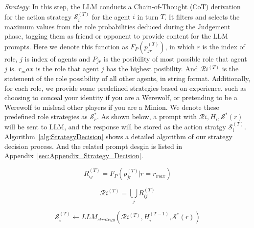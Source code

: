 \documentclass[11pt]{article}
\begin{document}
\textit{Strategy}: In this step, the LLM conducts a Chain-of-Thought (CoT) derivation for the action strategy $ \mathcal{S} _{i}^{(T)} $ for the agent $ i $ in turn $ T $. It filters and selects the maximum values from the role probabilities deduced during the Judgement phase, tagging them as friend or opponent to provide content for the LLM prompts. Here we denote this function as $ F_P( p_{jr}^{(T)} ) $, in which $ r $ is the index of role, $ j $ is index of agents and $ P_{jr} $ is the posibility of most possible role that agent $ j $ is. $ r_max $ is the role that agent $ j $ has the highest posibility. And $ \mathcal{R} {i}^{(T)} $ is the statement of the role possibility of all other agents, in string format. Additionally, for each role, we provide some predefined strategies based on experience, such as choosing to conceal your identity if you are a Werewolf, or pretending to be a Werewolf to mislead other players if you are a Minion. We denote these predefined role strategies as $ \mathcal{S} ^*_r $. As shown below, a prompt with $ \mathcal{R} i,H_i,\mathcal{S} ^*(r) $ will be sent to LLM, and the response will be stored as the action stratgy $ \mathcal{S} _{i}^{(T)} $. Algorithm~\ref{alg:StrategyDecision} shows a detailed algorithm of our strategy decision process. And the related prompt desgin is listed in Appendix~\ref{sec:Appendix_Strategy_Decision}.

\begin{equation}
  R_{ij}^{(T)} = F_P(  p_{jr}^{(T)} | r = r_{max} )
  \label{eq:stratety_possibility_statement}
\end{equation}

\begin{equation}
  \mathcal{R} i^{(T)} = \bigcup_{j} R_{ij}^{(T)}
  \label{eq:stratety_possibility_statement_append}
\end{equation}

\begin{equation}
  \mathcal{S} _i^{(T)} \leftarrow LLM_{strategy}(\mathcal{R} i^{(T)},H_i^{(T-1)},\mathcal{S} ^*(r))
  \label{eq:strategy_LLM_strategy}
\end{equation}
\end{document}
